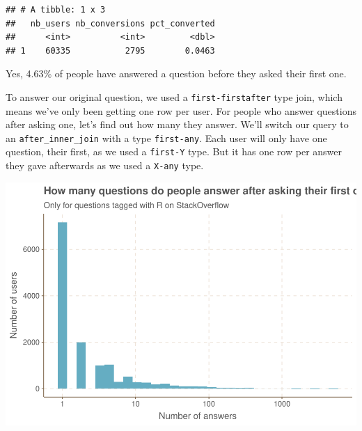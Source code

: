 \documentclass[]{article}
\newenvironment{Shaded}{\begin{snugshade}}{\end{snugshade}}
\newcommand{\KeywordTok}[1]{\textcolor[rgb]{0.13,0.29,0.53}{\textbf{#1}}}
\newcommand{\DataTypeTok}[1]{\textcolor[rgb]{0.13,0.29,0.53}{#1}}
\newcommand{\StringTok}[1]{\textcolor[rgb]{0.31,0.60,0.02}{#1}}
\newcommand{\OperatorTok}[1]{\textcolor[rgb]{0.81,0.36,0.00}{\textbf{#1}}}
\newcommand{\NormalTok}[1]{#1}
\begin{document}
\begin{verbatim}
## # A tibble: 1 x 3
##   nb_users nb_conversions pct_converted
##      <int>          <int>         <dbl>
## 1    60335           2795        0.0463
\end{verbatim}

Yes, 4.63\% of people have answered a question before they asked their
first one.

To answer our original question, we used a \texttt{first-firstafter}
type join, which means we've only been getting one row per user. For
people who answer questions after asking one, let's find out how many
they answer. We'll switch our query to an \texttt{after\_inner\_join}
with a type \texttt{first-any}. Each user will only have one question,
their first, as we used a \texttt{first-Y} type. But it has one row per
answer they gave afterwards as we used a \texttt{X-any} type.

\begin{Shaded}
\end{Shaded}

\includegraphics{2019-07-25-introducing-the-funneljoin-package_files/figure-latex/unnamed-chunk-15-1.pdf}
\end{document}
